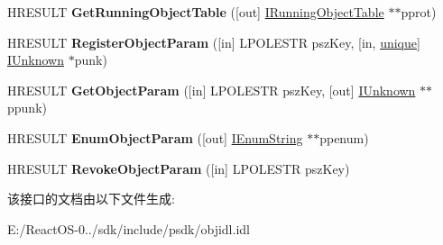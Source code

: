 \begin{DoxyCompactItemize}
\item 
\mbox{\label{interface_i_bind_ctx_a1d5af6e576fb8f0220030e0e483afcab}} 
H\+R\+E\+S\+U\+LT {\bfseries Get\+Running\+Object\+Table} (\mbox{[}out\mbox{]} \hyperlink{interface_i_running_object_table}{I\+Running\+Object\+Table} $\ast$$\ast$pprot)
\item 
\mbox{\label{interface_i_bind_ctx_ada2e1f7e95537aa33fc65add1e0d6d99}} 
H\+R\+E\+S\+U\+LT {\bfseries Register\+Object\+Param} (\mbox{[}in\mbox{]} L\+P\+O\+L\+E\+S\+TR psz\+Key, \mbox{[}in, \hyperlink{interfaceunique}{unique}\mbox{]} \hyperlink{interface_i_unknown}{I\+Unknown} $\ast$punk)
\item 
\mbox{\label{interface_i_bind_ctx_a71aacd68c35118a89e251ed4c91b4fe9}} 
H\+R\+E\+S\+U\+LT {\bfseries Get\+Object\+Param} (\mbox{[}in\mbox{]} L\+P\+O\+L\+E\+S\+TR psz\+Key, \mbox{[}out\mbox{]} \hyperlink{interface_i_unknown}{I\+Unknown} $\ast$$\ast$ppunk)
\item 
\mbox{\label{interface_i_bind_ctx_ae1eac66ae9b27fbc4c04b05bde179f84}} 
H\+R\+E\+S\+U\+LT {\bfseries Enum\+Object\+Param} (\mbox{[}out\mbox{]} \hyperlink{interface_i_enum_string}{I\+Enum\+String} $\ast$$\ast$ppenum)
\item 
\mbox{\label{interface_i_bind_ctx_a81a0d1b4f96e3acf47e3f4b1f7534b91}} 
H\+R\+E\+S\+U\+LT {\bfseries Revoke\+Object\+Param} (\mbox{[}in\mbox{]} L\+P\+O\+L\+E\+S\+TR psz\+Key)
\end{DoxyCompactItemize}


该接口的文档由以下文件生成\+:\begin{DoxyCompactItemize}
\item 
E\+:/\+React\+O\+S-\/0../sdk/include/psdk/objidl.\+idl\end{DoxyCompactItemize}
